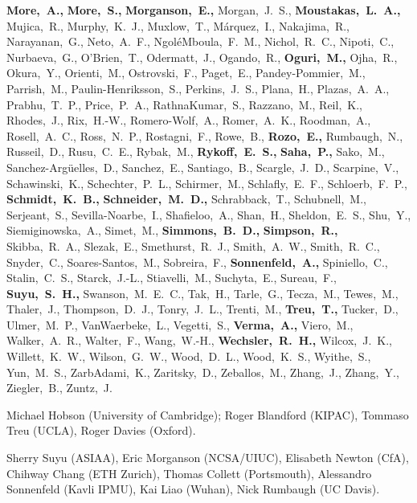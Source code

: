{\bf More,~A.,}
{\bf More,~S.,}
{\bf Morganson,~E.,}
Morgan,~J.~S.,
{\bf Moustakas,~L.~A.,}
Mujica,~R.,
Murphy,~K.~J.,
Muxlow,~T.,
M\'{a}rquez,~I.,
Nakajima,~R.,
Narayanan,~G.,
Neto,~A.~F.,
Ngol\'{e}Mboula,~F.~M.,
Nichol,~R.~C.,
Nipoti,~C.,
Nurbaeva,~G.,
O'Brien,~T.,
Odermatt,~J.,
Ogando,~R.,
{\bf Oguri,~M.,}
Ojha,~R.,
Okura,~Y.,
Orienti,~M.,
Ostrovski,~F.,
Paget,~E.,
Pandey-Pommier,~M.,
Parrish,~M.,
Paulin-Henriksson,~S.,
Perkins,~J.~S.,
Plana,~H.,
Plazas,~A.~A.,
Prabhu,~T.~P.,
Price,~P.~A.,
RathnaKumar,~S.,
Razzano,~M.,
Reil,~K.,
Rhodes,~J.,
Rix,~H.-W.,
Romero-Wolf,~A.,
Romer,~A.~K.,
Roodman,~A.,
Rosell,~A.~C.,
Ross,~N.~P.,
Rostagni,~F.,
Rowe,~B.,
{\bf Rozo,~E.,}
Rumbaugh,~N.,
Russeil,~D.,
Rusu,~C.~E.,
Rybak,~M.,
{\bf Rykoff,~E.~S.,}
{\bf Saha,~P.,}
Sako,~M.,
Sanchez-Arg\"{u}elles,~D.,
Sanchez,~E.,
Santiago,~B.,
Scargle,~J.~D.,
Scarpine,~V.,
Schawinski,~K.,
Schechter,~P.~L.,
Schirmer,~M.,
Schlafly,~E.~F.,
Schloerb,~F.~P.,
{\bf Schmidt,~K.~B.,}
{\bf Schneider,~M.~D.,}
Schrabback,~T.,
Schubnell,~M.,
Serjeant,~S.,
Sevilla-Noarbe,~I.,
Shafieloo,~A.,
Shan,~H.,
Sheldon,~E.~S.,
Shu,~Y.,
Siemiginowska,~A.,
Simet,~M.,
{\bf Simmons,~B.~D.,}
{\bf Simpson,~R.,}
Skibba,~R.~A.,
Slezak,~E.,
Smethurst,~R.~J.,
Smith,~A.~W.,
Smith,~R.~C.,
Snyder,~C.,
Soares-Santos,~M.,
Sobreira,~F.,
{\bf Sonnenfeld,~A.,}
Spiniello,~C.,
Stalin,~C.~S.,
Starck,~J.-L.,
Stiavelli,~M.,
Suchyta,~E.,
Sureau,~F.,
{\bf Suyu,~S.~H.,}
Swanson,~M.~E.~C.,
Tak,~H.,
Tarle,~G.,
Tecza,~M.,
Tewes,~M.,
Thaler,~J.,
Thompson,~D.~J.,
Tonry,~J.~L.,
Trenti,~M.,
{\bf Treu,~T.,}
Tucker,~D.,
Ulmer,~M.~P.,
VanWaerbeke,~L.,
Vegetti,~S.,
{\bf Verma,~A.,}
Viero,~M.,
Walker,~A.~R.,
Walter,~F.,
Wang,~W.-H.,
{\bf Wechsler,~R.~H.,}
Wilcox,~J.~K.,
Willett,~K.~W.,
Wilson,~G.~W.,
Wood,~D.~L.,
Wood,~K.~S.,
Wyithe,~S.,
Yun,~M.~S.,
ZarbAdami,~K.,
Zaritsky,~D.,
Zeballos,~M.,
Zhang,~J.,
Zhang,~Y.,
Ziegler,~B.,
Zuntz,~J.
\normalsize

\vspace{\baselineskip}

Michael Hobson (University of Cambridge);
Roger Blandford (KIPAC), Tommaso Treu (UCLA), Roger Davies (Oxford).

\vspace{\baselineskip}

Sherry Suyu (ASIAA), Eric Morganson (NCSA/UIUC), Elisabeth Newton (CfA),
Chihway Chang (ETH Zurich), Thomas Collett (Portsmouth), Alessandro Sonnenfeld (Kavli IPMU),
Kai Liao (Wuhan), Nick Rumbaugh (UC Davis).



